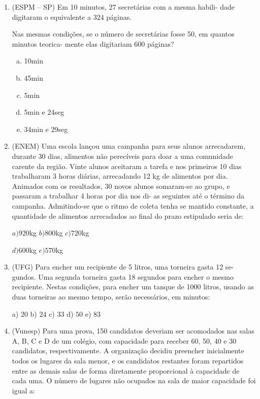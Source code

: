 \begin{multicols*}{2}
\begin{enumerate}[wide, labelwidth=!, labelindent=0pt]
		\item (ESPM -- SP) Em 10 minutos, 27 secretárias com a mesma habili- dade digitaram o equivalente a 324 páginas.

		      Nas mesmas condições, se o número de secretárias fosse 50, em quantos minutos teorica- mente elas digitariam 600 páginas?

		      \begin{enumerate}[(a)]
				  \item 10min 
				  \item 45min 
				  \item 5min
				  \item 5min e 24seg	  
				  \item 34min e 29seg
			\end{enumerate}

		\item (ENEM) Uma escola lançou uma campanha para seus alunos arrecadarem, durante 30 dias, alimentos não perecíveis para doar a uma comunidade carente da região. Vinte alunos aceitaram a tarefa e nos primeiros 10 dias trabalharam 3 horas diárias, arrecadando 12 kg de alimentos por dia. Animados com os resultados, 30 novos alunos somaram-se ao grupo, e passaram a trabalhar 4 horas por dia nos di- as seguintes até o término da campanha. Admitindo-se que o ritmo de coleta tenha se mantido constante, a quantidade de alimentos arrecadados ao final do prazo estipulado seria de:

		      $a)920$kg $ b)800$kg $ c)720$kg

		      $d)600$kg $ e)570$kg

		\item (UFG) Para encher um recipiente de 5 litros, uma torneira gasta 12 se- gundos. Uma segunda torneira gasta 18 segundos para encher o mesmo recipiente. Nestas condições, para encher um tanque de 1000 litros, usando as duas torneiras ao mesmo tempo, serão necessários, em minutos:

		      a) $20 $ b) $24 $ c) $33 $ d) $50 $ e) $83 $

		\item (Vunesp) Para uma prova, 150 candidatos deveriam ser acomodados nas salas A, B, C e D de um colégio, com capacidade para receber 60, 50, 40 e 30 candidatos, respectivamente. A organização decidiu preencher inicialmente todos os lugares da sala menor, e os candidatos restantes foram repartidos entre as demais salas de forma diretamente proporcional à capacidade de cada uma. O número de lugares não ocupados na sala de maior capacidade foi igual a:


\end{enumerate}
\end{multicols*}
